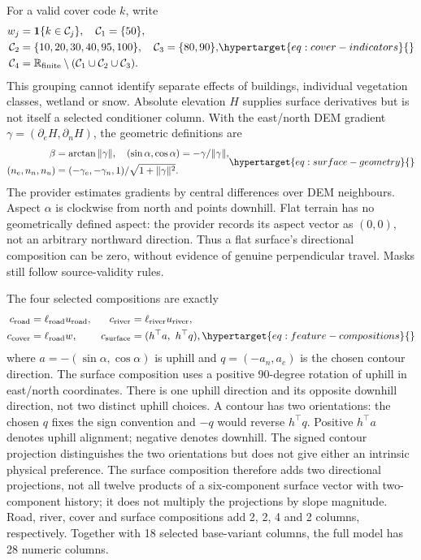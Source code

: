 For a valid cover code \(k\), write
\begin{equation}
 \begin{aligned}
 w_j&=\mathbf1\{k\in\mathcal C_j\},\quad\mathcal C_1=\{50\},\\
 \mathcal C_2&=\{10,20,30,40,95,100\},\quad\mathcal C_3=\{80,90\},\\
 \mathcal C_4&=\R_{\rm finite}\setminus(\mathcal C_1\cup\mathcal C_2\cup\mathcal C_3).
 \end{aligned}
 \label{eq:cover-indicators}\hypertarget{eq:cover-indicators}{}
\end{equation}
This grouping cannot identify separate effects of buildings, individual
vegetation classes, wetland or snow. Absolute elevation \(H\) supplies surface
derivatives but is not itself a selected conditioner column. With the
east/north DEM gradient \(\gamma=(\partial_e H,\partial_n H)\), the geometric
definitions are
\begin{equation}
 \begin{aligned}
 \beta&=\arctan\|\gamma\|,\quad (\sin\alpha,\cos\alpha)=-\gamma/\|\gamma\|,\\
 (n_e,n_n,n_u)&=(-\gamma_e,-\gamma_n,1)/\sqrt{1+\|\gamma\|^2}.
 \end{aligned}
 \label{eq:surface-geometry}\hypertarget{eq:surface-geometry}{}
\end{equation}
The provider estimates gradients by central differences over DEM neighbours.
Aspect \(\alpha\) is clockwise from north and points downhill.
Flat terrain has no geometrically defined aspect: the provider records its
aspect vector as \((0,0)\), not an arbitrary northward direction. Thus a flat
surface's directional composition can be zero, without evidence of genuine
perpendicular travel. Masks still follow source-validity rules.

The four selected compositions are exactly
\begin{align}
 c_{\rm road}&=\ell_{\rm road}u_{\rm road},&
 c_{\rm river}&=\ell_{\rm river}u_{\rm river},\notag\\
 c_{\rm cover}&=\ell_{\rm road}w,&
 c_{\rm surface}&=(h^\top a,\ h^\top q),
 \label{eq:feature-compositions}\hypertarget{eq:feature-compositions}{}
\end{align}
where \(a=-(\sin\alpha,\cos\alpha)\) is uphill and
\(q=(-a_n,a_e)\) is the chosen contour direction. The surface composition
uses a positive 90-degree rotation of uphill in east/north coordinates.
There is one uphill direction and its opposite downhill direction, not two
distinct uphill choices. A contour has two orientations: the chosen \(q\)
fixes the sign convention and \(-q\) would reverse \(h^\top q\).
Positive \(h^\top a\) denotes uphill alignment; negative denotes downhill.
The signed contour projection distinguishes the two orientations but does
not give either an intrinsic physical preference. The surface composition
therefore adds two directional projections, not all twelve products of a
six-component surface vector with two-component history; it does not multiply
the projections by slope magnitude. Road, river, cover and surface
compositions add 2, 2, 4 and 2 columns, respectively. Together with 18 selected
base-variant columns, the full model has 28 numeric columns.

